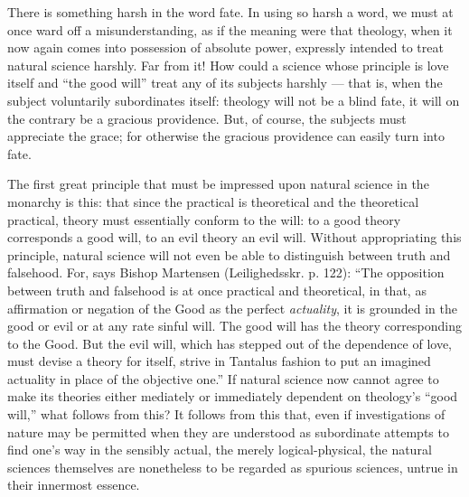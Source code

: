 \documentclass[12pt]{book}
\newcommand{\opage}[1]{\marginnote{\footnotesize\textit{[#1]}}}
\begin{document}
There is something harsh in the word fate. In using so harsh a word, we must at once ward off a misunderstanding, as if the meaning were that theology, when it now again comes into possession of absolute power, expressly intended to treat natural science harshly. Far from it! How could a science whose principle is love itself and ``the good will'' treat any of its subjects harshly --- that is, when the subject voluntarily subordinates itself: theology will not be a blind fate, it will on the contrary be a gracious providence. But, of course, the subjects must appreciate the grace; for otherwise the gracious providence can easily turn into fate.

The first great principle that must be impressed upon natural science in the monarchy is this: that since the practical is theoretical and the theoretical practical, theory must essentially conform to the will: to a good theory corresponds a good will, to an evil theory an evil will. Without appropriating this principle, natural science will not even be able to distinguish between truth and falsehood. For, says Bishop Martensen (Leilighedsskr. p. 122): ``The opposition between truth and falsehood is at once practical and theoretical, in that, as affirmation or negation of the Good as the perfect \emph{actuality}, it is grounded in the good or evil or at any rate sinful will. The good will has the theory corresponding to the Good. But the evil will, which has stepped out of the dependence of love, must devise a theory for itself, strive in Tantalus fashion to put an imagined actuality in place of the objective one.'' If natural science now cannot agree to make its theories either mediately or immediately dependent on theology's ``good will,''
\opage{10}\setcounter{footnote}{0}%
what follows from this? It follows from this that, even if investigations of nature may be permitted when they are understood as subordinate attempts to find one's way in the sensibly actual, the merely logical-physical, the natural sciences themselves are nonetheless to be regarded as spurious sciences, untrue in their innermost essence.
\end{document}
